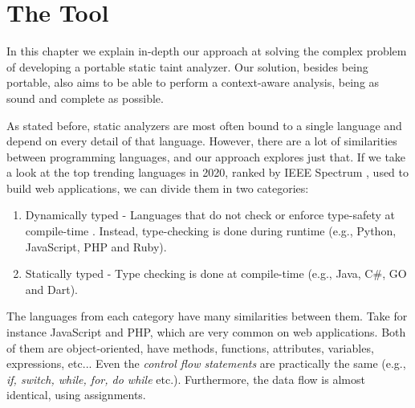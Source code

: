 
\chapter{The \toolname{} Tool}


\label{solution}
In this chapter we explain in-depth our approach at solving the complex problem of developing a portable static taint analyzer. Our solution, besides being portable, also aims to be able to perform a context-aware analysis, being as sound and complete as possible.

As stated before, static analyzers are most often bound to a single language and depend on every detail of that language. However, there are a lot of similarities between programming languages, and our approach explores just that. If we take a look at the top trending languages in 2020, ranked by IEEE Spectrum \cite{cass2020top}, used to build web applications, we can divide them in two categories:

\begin{enumerate}
    \item Dynamically typed - Languages that do not check or enforce type-safety at compile-time \cite{tratt2009dynamically}. Instead, type-checking is done during runtime (e.g., Python, JavaScript, PHP and Ruby).
    \item Statically typed - Type checking is done at compile-time (e.g., Java, C\#, GO and Dart).
\end{enumerate}


The languages from each category have many similarities between them. Take for instance JavaScript and PHP, which are very common on web applications. Both of them are object-oriented, have methods, functions, attributes, variables, expressions, etc... Even the \textit{control flow statements} are practically the same (e.g., \textit{if, switch, while, for, do while} etc.). Furthermore, the data flow is almost identical, using assignments. 

